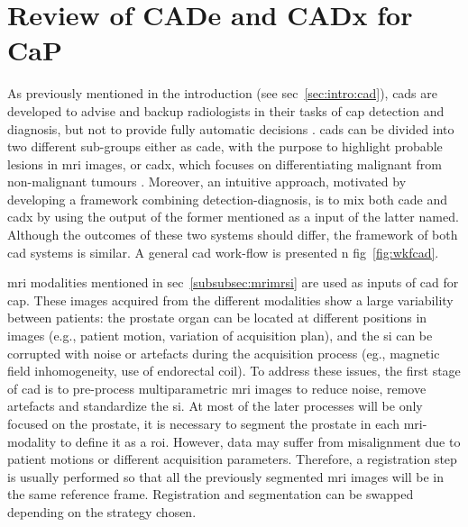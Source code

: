 \chapter{Review of CADe and CADx for CaP}\label{chap:3}
\ifpdf
    \graphicspath{{3_review/figures/}}
\else
    \graphicspath{{3_review/figures/}}
\fi


As previously mentioned in the introduction (see \acs{sec}~\ref{sec:intro:cad}), \acp{cad} are developed to advise and backup radiologists in their tasks of \ac{cap} detection and diagnosis, but not to provide fully automatic decisions \cite{Giger2008}.
\acp{cad} can be divided into two different sub-groups either as \ac{cade}, with the purpose to highlight probable lesions in \ac{mri} images, or \ac{cadx}, which focuses on differentiating malignant from non-malignant tumours \cite{Giger2008}.
Moreover, an intuitive approach, motivated by developing a framework combining detection-diagnosis, is to mix both \ac{cade} and \ac{cadx} by using the output of the former mentioned as a input of the latter named.
Although the outcomes of these two systems should differ, the framework of both \ac{cad} systems is similar.
A general \ac{cad} work-flow is presented n \acs{fig}~\ref{fig:wkfcad}. 

\ac{mri} modalities mentioned in \acs{sec}~\ref{subsubsec:mrimrsi} are used as inputs of \ac{cad} for \ac{cap}.
These images acquired from the different modalities show a large variability between patients: the prostate organ can be located at different positions in images (e.g., patient motion, variation of acquisition plan), and the \ac{si} can be corrupted with noise or artefacts during the acquisition process (eg., magnetic field inhomogeneity, use of endorectal coil).
To address these issues, the first stage of \ac{cad} is to pre-process multiparametric \ac{mri} images to reduce noise, remove artefacts and standardize the \ac{si}.
At most of the later processes will be only focused on the prostate, it is necessary to segment the prostate in each \ac{mri}-modality to define it as a \acs{roi}.
However, data may suffer from misalignment due to patient motions or different acquisition parameters.
Therefore, a registration step is usually performed so that all the previously segmented \ac{mri} images will be in the same reference frame.
Registration and segmentation can be swapped depending on the strategy chosen.

